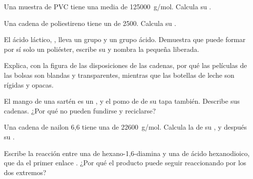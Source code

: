 \begin{exercise}[$\star\star$]\label{exo:g12:polymers:6}
Una muestra de PVC tiene una  media de \qty{125000}{g/mol}.
Calcula su .
\end{exercise}

\begin{exercise}[$\star\star$]\label{exo:g12:polymers:7}
Una cadena de poliestireno tiene un  de 2500.
Calcula su .
\end{exercise}

\begin{exercise}[$\star\star$]\label{exo:g12:polymers:8}
El ácido láctico, , lleva un grupo  y un grupo
ácido. Demuestra que puede formar por sí solo un poliéster, escribe su
 y nombra la  pequeña liberada.
\end{exercise}

\begin{exercise}[$\star\star$]\label{exo:g12:polymers:9}
Explica, con la figura de las disposiciones de las cadenas, por qué las
películas de las bolsas son blandas y transparentes, mientras que las
botellas de leche son rígidas y opacas.
\end{exercise}

\begin{exercise}[$\star\star$]\label{exo:g12:polymers:10}
El mango de una sartén es un , y el pomo de  de su
tapa también. Describe sus cadenas. ¿Por qué no pueden fundirse y
reciclarse?
\end{exercise}

\begin{exercise}[$\star\star$]\label{exo:g12:polymers:11}
Una cadena de nailon 6,6 tiene una  de \qty{22600}{g/mol}.
Calcula la  de su  , y
después su .
\end{exercise}

\begin{exercise}[$\star\star\star$]\label{exo:g12:polymers:12}
Escribe la reacción entre una  de hexano-1,6-diamina y una de
ácido hexanodioico, que da el primer enlace . ¿Por qué el producto
puede seguir reaccionando por los dos extremos?
\end{exercise}


